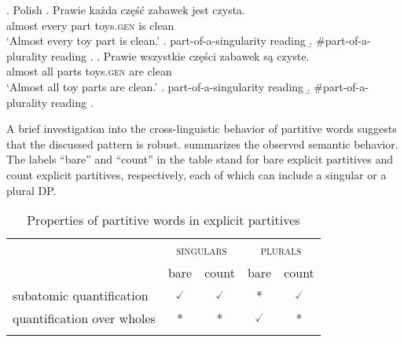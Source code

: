 \ex.\label{ex:count-explicit-partitives-polish-quantifiers} Polish
\ag. Prawie każda część zabawek jest czysta.\label{ex:count-explicit-partitives-polish-every}\\
almost every part toys\textsc{.gen} is clean\\
`Almost every toy part is clean.'
\a. part-of-a-singularity reading
\b. \#part-of-a-plurality reading
\z.
\bg. Prawie wszystkie części zabawek są czyste.\label{ex:count-explicit-partitives-polish-all}\\
almost all parts toys\textsc{.gen} are clean\\
`Almost all toy parts are clean.'
\a. part-of-a-singularity reading
\b. \#part-of-a-plurality reading
\z.

A brief investigation into the cross-linguistic behavior of partitive words suggests that the discussed pattern is robust.   summarizes the observed semantic behavior. The labels ``bare'' and ``count'' in the table stand for bare explicit partitives and count explicit partitives, respectively, each of which can include a singular or a plural DP.

    \begin{table}[h]
    \centering
\begin{tabular}{lcccc}
\lsptoprule
                           & \multicolumn{2}{c}{\textsc{singulars}}          & \multicolumn{2}{c}{\textsc{plurals}} \\
                           & bare & count & bare & count \\ \midrule
subatomic quantification   & $\checked$                   & $\checked$                    & *                              & $\checked$ \\
quantification over wholes & *                              & *                               & $\checked$                   & * \\ \lspbottomrule
\end{tabular}
\caption{Properties of partitive words in explicit partitives}
\label{tab:properties-of-partitive-words}
\end{table}

